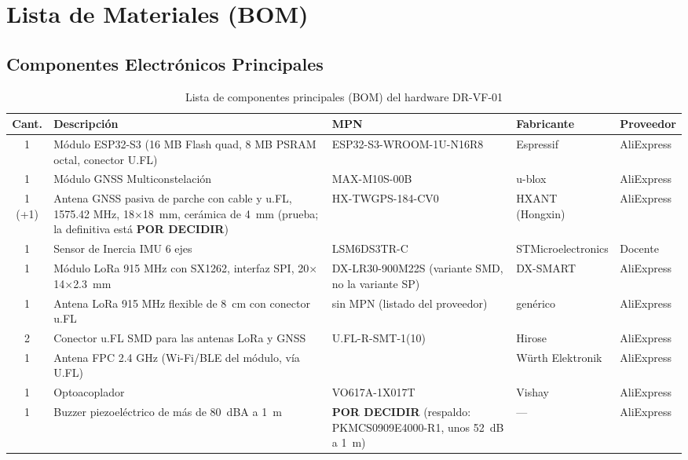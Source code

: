 \section{Lista de Materiales (BOM)}

\subsection{Componentes Electrónicos Principales}

\begin{table}[H]
\centering
\small
\caption{Lista de componentes principales (BOM) del hardware DR-VF-01}
\label{tab:hardware_bom}
\vspace{2mm}
\begin{tabularx}{\textwidth}{c >{\raggedright\arraybackslash}X >{\raggedright\arraybackslash}X l l}
\toprule
\rowcolor{categorybg}
\textbf{Cant.} & \textbf{Descripción} & \textbf{MPN} & \textbf{Fabricante} & \textbf{Proveedor} \\
\midrule
1 & Módulo ESP32-S3 (16 MB Flash quad, 8 MB PSRAM octal, conector U.FL) & ESP32-S3-WROOM-1U-N16R8 & Espressif & AliExpress \\
\rowcolor{rowalt}
1 & Módulo GNSS Multiconstelación & MAX-M10S-00B & u-blox & AliExpress \\
1 (+1) & Antena GNSS pasiva de parche con cable y u.FL, 1575.42 MHz, 18$\times$18~mm, cerámica de 4~mm (prueba; la definitiva está \textbf{POR DECIDIR}) & HX-TWGPS-184-CV0 & HXANT (Hongxin) & AliExpress \\
\rowcolor{rowalt}
1 & Sensor de Inercia IMU 6 ejes & LSM6DS3TR-C & STMicroelectronics & Docente \\
1 & Módulo LoRa 915 MHz con SX1262, interfaz SPI, 20$\times$14$\times$2.3~mm & DX-LR30-900M22S (variante SMD, no la variante SP) & DX-SMART & AliExpress \\
\rowcolor{rowalt}
1 & Antena LoRa 915 MHz flexible de 8~cm con conector u.FL & sin MPN (listado del proveedor) & genérico & AliExpress \\
2 & Conector u.FL SMD para las antenas LoRa y GNSS & U.FL-R-SMT-1(10) & Hirose & AliExpress \\
\rowcolor{rowalt}
1 & Antena FPC 2.4 GHz (Wi-Fi/BLE del módulo, vía U.FL) & 2015301200 & Würth Elektronik & AliExpress \\
1 & Optoacoplador & VO617A-1X017T & Vishay & AliExpress \\
\rowcolor{rowalt}
1 & Buzzer piezoeléctrico de más de 80~dBA a 1~m & \textbf{POR DECIDIR} (respaldo: PKMCS0909E4000-R1, unos 52~dB a 1~m) & --- & AliExpress \\

\end{tabularx}
\end{table}

